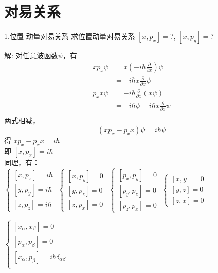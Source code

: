 \section{对易关系}
\begin{frame} [allowframebreaks=]
    \begin{tcolorbox1}{1.位置-动量对易关系}
        求位置动量对易关系 $[x,p_x]=?$,  $[x,p_y]=?$
    \end{tcolorbox1}
    \alert{解:} 对任意波函数$\psi$，有
    \begin{equation*}
        \begin{split}
        xp_x\psi&= x(-i\hbar \frac{\partial}{\partial x})\psi \\
        &=-i\hbar x \frac{\partial}{\partial x}\psi\\
        p_x x \psi&= -i\hbar \frac{\partial}{\partial x} (x\psi) \\
        &=-i\hbar\psi - i\hbar x \frac{\partial}{\partial x}\psi \\
        \end{split}  
    \end{equation*}
    两式相减，$$(xp_x-p_x x)\psi= i\hbar\psi$$
    得 $xp_x-p_x x= i\hbar$ \\
    即 $[x,p_x]= i\hbar$\\
    同理，有：\\
    $\begin{cases}
        [x,p_x]= i\hbar  \\ 
        [y,p_y]= i\hbar  \\ 
        [z,p_z]= i\hbar  
    \end{cases}$
    $\begin{cases}
        [x,p_y]= 0  \\ 
        [y,p_z]= 0  \\ 
        [z,p_x]= 0  
    \end{cases}$
    $\begin{cases}
        [p_x,p_y]= 0  \\ 
        [p_y,p_z]= 0  \\ 
        [p_z,p_x]= 0  
    \end{cases}$
    $\begin{cases}
        [x,y]= 0  \\ 
        [y,z]= 0  \\ 
        [z,x]= 0  
    \end{cases}$ \\
    \begin{tcolorbox}[colback=yellow!5,colframe=red!75!black,title=量子力学基本对易关系]
    $\begin{cases}
        [x_\alpha,x_\beta]= 0  \\ 
        [p_\alpha,p_\beta]= 0  \\ 
        [x_\alpha,p_\beta]= i\hbar \delta_{\alpha\beta}  \\ 
    \end{cases}$
    \end{tcolorbox}
\end{frame} 

